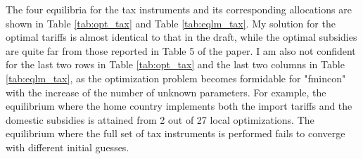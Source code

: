 \documentclass{homeworg}
\begin{document}
The four equilibria for the tax instruments and its corresponding allocations are shown in Table \ref{tab:opt_tax} and Table \ref{tab:eqlm_tax}. My solution for the optimal tariffs is almost identical to that in the draft, while the optimal subsidies are quite far from those reported in Table 5 of the paper. I am also not confident for the last two rows in Table \ref{tab:opt_tax} and the last two columns in Table \ref{tab:eqlm_tax}, as the optimization problem becomes formidable for "fmincon" with the increase of the number of unknown parameters. For example, the equilibrium where the home country implements both the import tariffs and the domestic subsidies is attained from 2 out of 27 local optimizations. The equilibrium where the full set of tax instruments is performed fails to converge with different initial guesses. 















\end{document}
